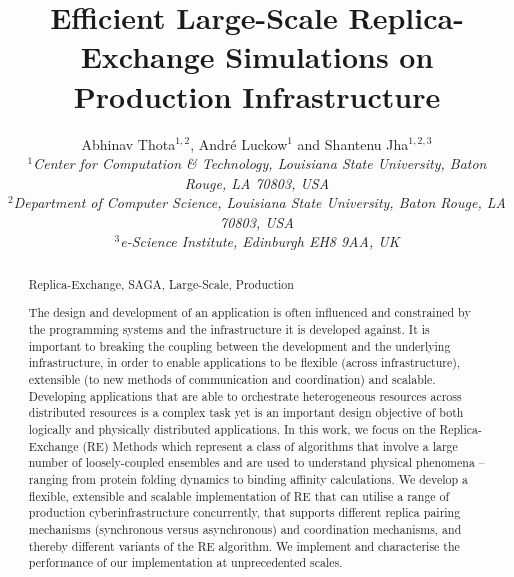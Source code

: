 \documentclass{rspublic}
\title[Efficient Large-Scale Replica-Exchange Simulations on
Production Infrastructure]{Efficient Large-Scale Replica-Exchange
  Simulations on Production Infrastructure}
\author[Thota, Luckow, Jha]{
  Abhinav Thota$^{1,2}$, Andr\'e Luckow$^{1}$ and Shantenu Jha$^{1,2,3}$\\
  \small{\emph{$^{1}$Center for Computation \& Technology, Louisiana State University, Baton Rouge, LA 70803, USA}}\\
  \small{\emph{$^{2}$Department of Computer Science, Louisiana State
      University, Baton Rouge, LA 70803, USA}}\\
  \small{\emph{$^{3}$e-Science Institute, Edinburgh EH8 9AA, UK}}\\
}
\begin{document}
 


\maketitle    

\begin{abstract}{Replica-Exchange, SAGA, Large-Scale, Production}  

  The design and development of an application is often influenced and
  constrained by the programming systems and the infrastructure it is
  developed against.  It is important to breaking the coupling between
  the development and the underlying infrastructure, in order to
  enable applications to be flexible (across infrastructure),
  extensible (to new methods of communication and coordination) and
  scalable.  Developing applications that are able to orchestrate
  heterogeneous resources across distributed resources is a complex
  task yet is an important design objective of both logically and
  physically distributed applications.  In this work, we focus on the
  Replica-Exchange (RE) Methods which represent a class of algorithms
  that involve a large number of loosely-coupled ensembles and are
  used to understand physical phenomena -- ranging from protein
  folding dynamics to binding affinity calculations.  We develop a
  flexible, extensible and scalable implementation of RE that can
  utilise a range of production cyberinfrastructure concurrently, that
  supports different replica pairing mechanisms (synchronous versus
  asynchronous) and coordination mechanisms, and thereby different
  variants of the RE algorithm. We implement and characterise the
  performance of our implementation at unprecedented scales.



\end{abstract}
\end{document}
